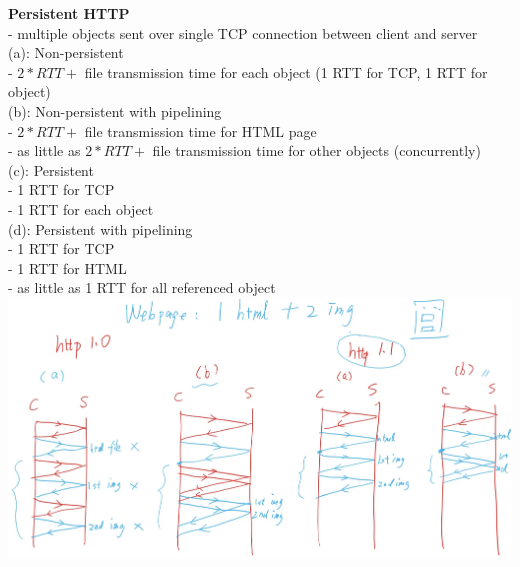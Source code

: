 \documentclass[10pt, a4paper]{article}
\begin{document}
\begin{multicols*}{3}
		\textbf{Persistent HTTP}\\
		- multiple objects sent over single TCP connection between client and server\\

		(a): Non-persistent\\
		- $2 * RTT + $ file transmission time for each object (1 RTT for TCP, 1 RTT for object)\\
		(b): Non-persistent with pipelining\\
		- $2 * RTT + $ file transmission time for HTML page\\
		- as little as $2 * RTT + $ file transmission time for other objects (concurrently)\\
		(c): Persistent\\
		- 1 RTT for TCP\\
		- 1 RTT for each object\\
		(d): Persistent with pipelining\\
		- 1 RTT for TCP\\
		- 1 RTT for HTML\\
		- as little as 1 RTT for all referenced object\\

		\includegraphics[scale=.12]{./assets/httpDiagrams}


\end{multicols*}
\end{document}
